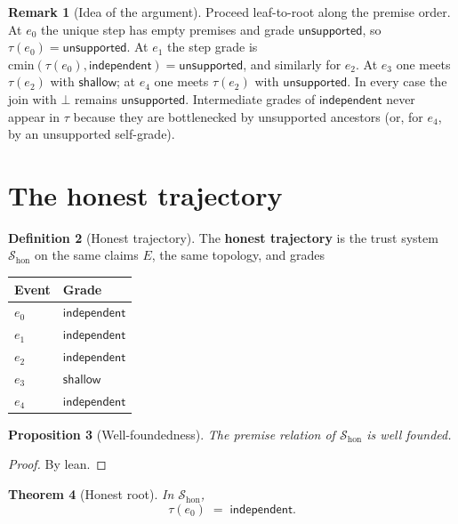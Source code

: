 \documentclass[11pt,a4paper]{article}
\theoremstyle{plain}
\newtheorem{theorem}{Theorem}[section]
\newtheorem{proposition}[theorem]{Proposition}
\theoremstyle{definition}
\newtheorem{definition}[theorem]{Definition}
\newtheorem{remark}[theorem]{Remark}
\newcommand{\cmin}{\mathrm{cmin}}
\newcommand{\tauu}{\tau}
\begin{document}
\begin{remark}[Idea of the argument]
Proceed leaf-to-root along the premise order. At $e_0$ the unique step has
empty premises and grade $\mathsf{unsupported}$, so
$\tauu(e_0) = \mathsf{unsupported}$. At $e_1$ the step grade is
$\cmin(\tauu(e_0), \mathsf{independent}) = \mathsf{unsupported}$, and
similarly for $e_2$. At $e_3$ one meets $\tauu(e_2)$ with
$\mathsf{shallow}$; at $e_4$ one meets $\tauu(e_2)$ with
$\mathsf{unsupported}$. In every case the join with $\bot$ remains
$\mathsf{unsupported}$. Intermediate grades of $\mathsf{independent}$ never
appear in $\tauu$ because they are bottlenecked by unsupported ancestors
(or, for $e_4$, by an unsupported self-grade).
\end{remark}

\section{The honest trajectory}

\begin{definition}[Honest trajectory]\label{def:honest}
The \textbf{honest trajectory} is the trust system
$\mathcal{S}_{\mathrm{hon}}$ on the same claims $E$, the same topology, and
grades
\begin{center}
\begin{tabular}{ll}
\hline
Event & Grade \\
\hline
$e_0$ & $\mathsf{independent}$ \\
$e_1$ & $\mathsf{independent}$ \\
$e_2$ & $\mathsf{independent}$ \\
$e_3$ & $\mathsf{shallow}$ \\
$e_4$ & $\mathsf{independent}$ \\
\hline
\end{tabular}
\end{center}
\end{definition}

\begin{proposition}[Well-foundedness]
The premise relation of $\mathcal{S}_{\mathrm{hon}}$ is well founded.
\end{proposition}

\begin{proof}
By lean.
\end{proof}

\begin{theorem}[Honest root]\label{thm:hon-e0}
In $\mathcal{S}_{\mathrm{hon}}$,
\begin{equation}
  \tauu(e_0) \;=\; \mathsf{independent}.
\end{equation}
\end{theorem}
\end{document}

